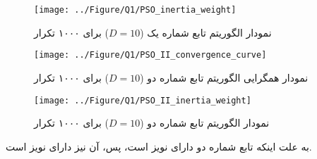 \begin{figure}[H]
	\caption{نمودار  الگوریتم  تابع شماره یک ($D=10$) برای ۱۰۰۰ تکرار } 
	\centering 
	\texttt{[image: ../Figure/Q1/PSO\_inertia\_weight]} 
\end{figure}

 \begin{figure}[H]
	\caption{نمودار همگرایی الگوریتم  تابع شماره دو ($D=10$) برای ۱۰۰۰ تکرار } 
	\centering 
	\texttt{[image: ../Figure/Q1/PSO\_II\_convergence\_curve]} 
\end{figure}

\begin{figure}[H]
	\caption{نمودار  الگوریتم  تابع شماره دو ($D=10$) برای ۱۰۰۰ تکرار } 
	\centering 
	\texttt{[image: ../Figure/Q1/PSO\_II\_inertia\_weight]} 
\end{figure}

به علت اینکه تابع شماره دو دارای نویز است، پس، 
آن نیز دارای نویز است.

